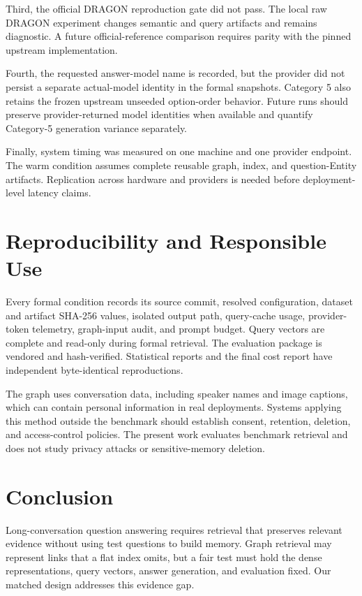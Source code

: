 \documentclass[10pt,twocolumn]{article}
\begin{document}
Third, the official DRAGON reproduction gate did not pass. The local raw
DRAGON experiment changes semantic and query artifacts and remains diagnostic.
A future official-reference comparison requires parity with the pinned
upstream implementation.

Fourth, the requested answer-model name is recorded, but the provider did not
persist a separate actual-model identity in the formal snapshots. Category 5
also retains the frozen upstream unseeded option-order behavior. Future runs
should preserve provider-returned model identities when available and quantify
Category-5 generation variance separately.

Finally, system timing was measured on one machine and one provider endpoint.
The warm condition assumes complete reusable graph, index, and
question-Entity artifacts. Replication across hardware and providers is
needed before deployment-level latency claims.

\section{Reproducibility and Responsible Use}

Every formal condition records its source commit, resolved configuration,
dataset and artifact SHA-256 values, isolated output path, query-cache usage,
provider-token telemetry, graph-input audit, and prompt budget. Query vectors
are complete and read-only during formal retrieval. The evaluation package is
vendored and hash-verified. Statistical reports and the final cost report have
independent byte-identical reproductions.

The graph uses conversation data, including speaker names and image captions,
which can contain personal information in real deployments. Systems applying
this method outside the benchmark should establish consent, retention,
deletion, and access-control policies. The present work evaluates benchmark
retrieval and does not study privacy attacks or sensitive-memory deletion.

\section{Conclusion}

Long-conversation question answering requires retrieval that preserves
relevant evidence without using test questions to build memory. Graph
retrieval may represent links that a flat index omits, but a fair test must
hold the dense representations, query vectors, answer generation, and
evaluation fixed. Our matched design addresses this evidence gap.
\end{document}
